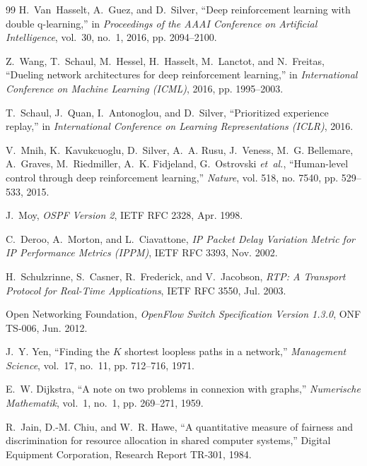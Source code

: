 \documentclass[12pt,a4paper,oneside]{report}
\begin{document}
\begin{thebibliography}{99}
H.~Van~Hasselt, A.~Guez, and D.~Silver, ``Deep reinforcement learning with double q-learning,'' in \emph{Proceedings of the AAAI Conference on Artificial Intelligence}, vol.~30, no.~1, 2016, pp. 2094--2100.

Z.~Wang, T.~Schaul, M.~Hessel, H.~Hasselt, M.~Lanctot, and N.~Freitas, ``Dueling network architectures for deep reinforcement learning,'' in \emph{International Conference on Machine Learning (ICML)}, 2016, pp. 1995--2003.

T.~Schaul, J.~Quan, I.~Antonoglou, and D.~Silver, ``Prioritized experience replay,'' in \emph{International Conference on Learning Representations (ICLR)}, 2016.

V.~Mnih, K.~Kavukcuoglu, D.~Silver, A.~A. Rusu, J.~Veness, M.~G. Bellemare, A.~Graves, M.~Riedmiller, A.~K. Fidjeland, G.~Ostrovski \emph{et~al.}, ``Human-level control through deep reinforcement learning,'' \emph{Nature}, vol. 518, no. 7540, pp. 529--533, 2015.

J.~Moy, \emph{{OSPF Version 2}}, IETF RFC 2328, Apr. 1998.

C.~Deroo, A.~Morton, and L.~Ciavattone, \emph{{IP Packet Delay Variation Metric for IP Performance Metrics (IPPM)}}, IETF RFC 3393, Nov. 2002.

H.~Schulzrinne, S.~Casner, R.~Frederick, and V.~Jacobson, \emph{{RTP: A Transport Protocol for Real-Time Applications}}, IETF RFC 3550, Jul. 2003.

{Open Networking Foundation}, \emph{{OpenFlow Switch Specification Version 1.3.0}}, ONF TS-006, Jun. 2012.

J.~Y. Yen, ``Finding the {$K$} shortest loopless paths in a network,'' \emph{Management Science}, vol.~17, no.~11, pp. 712--716, 1971.

E.~W. Dijkstra, ``A note on two problems in connexion with graphs,'' \emph{Numerische Mathematik}, vol.~1, no.~1, pp. 269--271, 1959.

R.~Jain, D.-M. Chiu, and W.~R. Hawe, ``A quantitative measure of fairness and discrimination for resource allocation in shared computer systems,'' Digital Equipment Corporation, Research Report TR-301, 1984.


\end{thebibliography}
\end{document}
